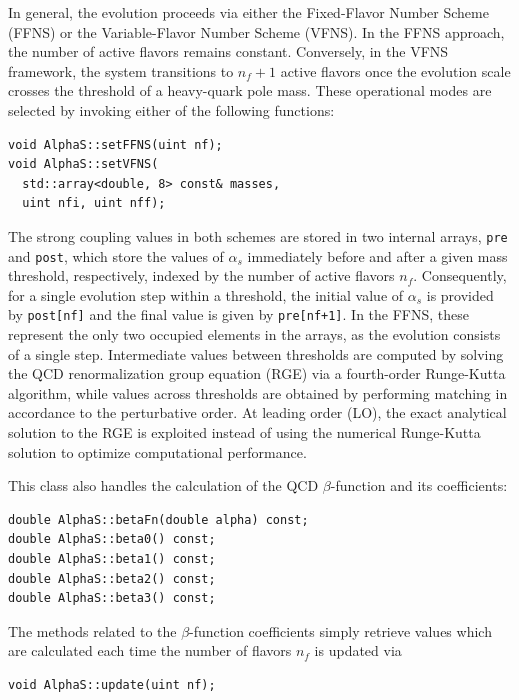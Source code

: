 \documentclass[preprint,12pt]{elsarticle}
\begin{document}
In general, the evolution proceeds via either the 
Fixed-Flavor Number Scheme (FFNS) or the Variable-Flavor Number Scheme (VFNS). 
In the FFNS approach, the number of active flavors remains constant. 
Conversely, in the VFNS framework, the system transitions to $n_f+1$ 
active flavors once the evolution scale crosses the threshold of 
a heavy-quark pole mass. These operational modes are selected by 
invoking either of the following functions:


\begin{verbatim}
void AlphaS::setFFNS(uint nf);
void AlphaS::setVFNS(
  std::array<double, 8> const& masses,
  uint nfi, uint nff);
\end{verbatim}

The strong coupling values in both schemes are 
stored in two internal arrays, \texttt{pre} and 
\texttt{post}, which store the values of $\alpha_s$ 
immediately before and after a given mass threshold, respectively, 
indexed by the number of active flavors $n_f$. Consequently, 
for a single evolution step within a threshold, 
the initial value of $\alpha_s$ is provided by \texttt{post[nf]}
and the final value is given by \texttt{pre[nf+1]}.
In the FFNS, these represent the only two occupied elements in 
the arrays, as the evolution consists of a single step. 
Intermediate values 
between thresholds are computed by solving the QCD renormalization 
group equation (RGE) via a fourth-order Runge-Kutta algorithm, while values across thresholds are obtained by performing matching in accordance to the perturbative order.
At leading order (LO), the exact analytical solution to the RGE is exploited instead of using the numerical Runge-Kutta solution to optimize computational performance.

This class also handles the calculation of the QCD $\beta$-function and its coefficients:

\begin{verbatim}
double AlphaS::betaFn(double alpha) const;
double AlphaS::beta0() const;
double AlphaS::beta1() const;
double AlphaS::beta2() const;
double AlphaS::beta3() const;
\end{verbatim}

The methods related to the $\beta$-function coefficients simply retrieve values which are calculated each time the number of flavors $n_f$ is updated via

\begin{verbatim}
void AlphaS::update(uint nf);
\end{verbatim}
\end{document}
